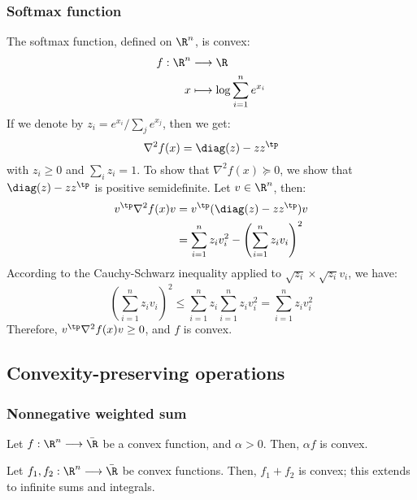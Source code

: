 \subsubsection{Softmax function}
The softmax function, defined on $\R^n$, is convex:
\begin{equation*}
    \begin{aligned}
        f: \R^n&\longrightarrow\R \\
        x &\longmapsto \log\sum_{i=1}^n e^{x_i}
    \end{aligned}
\end{equation*}
If we denote by $z_i = e^{x_i}/\sum_j e^{x_j}$, then we get:
\begin{equation*}
    \nabla^2 f(x) = \diag(z) - zz^\tp
\end{equation*}
with $z_i\geq0$ and $\sum_i z_i = 1$. To show that $\nabla^2 f(x)\succcurlyeq 0$, we show that $\diag(z) - zz^\tp$ is positive semidefinite. Let $v\in\R^n$, then:
\begin{equation*}
    \begin{aligned}
        v^\tp\nabla^2 f(x)v 
        &= v^\tp(\diag(z) - zz^\tp)v \\
        &= \sum_{i=1}^n z_i v_i^2 - \left(\sum_{i=1}^n z_i v_i\right)^2 \\
    \end{aligned}
\end{equation*}
According to the Cauchy-Schwarz inequality applied to $\sqrt{z_i}\times\sqrt{z_i}v_i$, we have:
\begin{equation*}
    \left(\sum_{i=1}^n z_i v_i\right)^2 \leq \sum_{i=1}^n z_i \sum_{i=1}^n z_i v_i^2 = \sum_{i=1}^n z_i v_i^2
\end{equation*}
Therefore, $v^\tp\nabla^2 f(x)v \geq 0$, and $f$ is convex.

\subsection{Convexity-preserving operations}
\subsubsection{Nonnegative weighted sum}
\begin{property}
    Let $f:\R^n\longrightarrow\bar{\R}$ be a convex function, and $\alpha>0$. Then, $\alpha f$ is convex.
\end{property}

\begin{property}[Sum]
    Let $f_1, f_2:\R^n\longrightarrow\bar{\R}$ be convex functions. Then, $f_1+f_2$ is convex; this extends to infinite sums and integrals.
\end{property}

